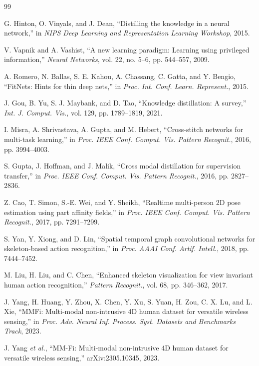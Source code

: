 ﻿\documentclass[UTF8,twocolumn]{ctexart}
\begin{document}
{\footnotesize
\setlength{\itemsep}{0pt}
\setlength{\parsep}{0pt}
\begin{thebibliography}{99}

G. Hinton, O. Vinyals, and J. Dean, ``Distilling the knowledge in a neural network,'' in \emph{NIPS Deep Learning and Representation Learning Workshop}, 2015.

V. Vapnik and A. Vashist, ``A new learning paradigm: Learning using privileged information,'' \emph{Neural Networks}, vol. 22, no. 5--6, pp. 544--557, 2009.

A. Romero, N. Ballas, S. E. Kahou, A. Chassang, C. Gatta, and Y. Bengio, ``FitNets: Hints for thin deep nets,'' in \emph{Proc. Int. Conf. Learn. Represent.}, 2015.

J. Gou, B. Yu, S. J. Maybank, and D. Tao, ``Knowledge distillation: A survey,'' \emph{Int. J. Comput. Vis.}, vol. 129, pp. 1789--1819, 2021.

I. Misra, A. Shrivastava, A. Gupta, and M. Hebert, ``Cross-stitch networks for multi-task learning,'' in \emph{Proc. IEEE Conf. Comput. Vis. Pattern Recognit.}, 2016, pp. 3994--4003.

S. Gupta, J. Hoffman, and J. Malik, ``Cross modal distillation for supervision transfer,'' in \emph{Proc. IEEE Conf. Comput. Vis. Pattern Recognit.}, 2016, pp. 2827--2836.

Z. Cao, T. Simon, S.-E. Wei, and Y. Sheikh, ``Realtime multi-person 2D pose estimation using part affinity fields,'' in \emph{Proc. IEEE Conf. Comput. Vis. Pattern Recognit.}, 2017, pp. 7291--7299.

S. Yan, Y. Xiong, and D. Lin, ``Spatial temporal graph convolutional networks for skeleton-based action recognition,'' in \emph{Proc. AAAI Conf. Artif. Intell.}, 2018, pp. 7444--7452.

M. Liu, H. Liu, and C. Chen, ``Enhanced skeleton visualization for view invariant human action recognition,'' \emph{Pattern Recognit.}, vol. 68, pp. 346--362, 2017.

J. Yang, H. Huang, Y. Zhou, X. Chen, Y. Xu, S. Yuan, H. Zou, C. X. Lu, and L. Xie, ``MMFi: Multi-modal non-intrusive 4D human dataset for versatile wireless sensing,'' in \emph{Proc. Adv. Neural Inf. Process. Syst. Datasets and Benchmarks Track}, 2023.

J. Yang \emph{et al.}, ``MM-Fi: Multi-modal non-intrusive 4D human dataset for versatile wireless sensing,'' arXiv:2305.10345, 2023.


\end{thebibliography}}
\end{document}
